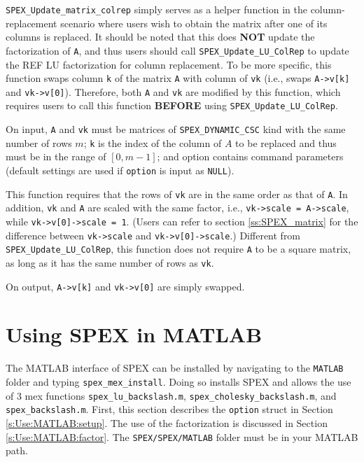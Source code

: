 \documentclass[12pt]{report}
\theoremstyle{definition}
\begin{document}
{\verb|SPEX_Update_matrix_colrep| simply serves as a helper function in the column-replacement scenario where users wish to obtain the matrix after one of its columns is replaced. It should be noted that this does {\bf NOT} update the factorization of \verb|A|, and thus users should call \verb|SPEX_Update_LU_ColRep| to update the REF LU factorization for column replacement. To be more specific, this function swaps column \verb|k| of the matrix \verb|A| with column of \verb|vk| (i.e., swaps \verb|A->v[k]| and \verb|vk->v[0]|). Therefore, both \verb|A| and \verb|vk| are modified by this function, which requires users to call this function {\bf BEFORE} using \verb|SPEX_Update_LU_ColRep|.

On input, \verb|A| and \verb|vk| must be matrices of \verb|SPEX_DYNAMIC_CSC| kind with the same number of rows $m$; \verb|k| is the index of the column of $A$ to be replaced and thus must be in the range of $[0,m-1]$; and option contains command parameters (default settings are used if \verb|option| is input as \verb|NULL|).

This function requires that the rows of \verb|vk| are in the same order as that of \verb|A|. In addition, \verb|vk| and \verb|A|  are scaled with the same factor, i.e., \verb|vk->scale = A->scale|, while \verb|vk->v[0]->scale = 1|. (Users can refer to section \ref{ss:SPEX_matrix} for the difference between \verb|vk->scale| and \verb|vk->v[0]->scale|.) Different from \verb|SPEX_Update_LU_ColRep|, this function does not require \verb|A| to be a square matrix, as long as it has the same number of rows as \verb|vk|.

On output, \verb|A->v[k]| and \verb|vk->v[0]| are simply swapped. 
}

\chapter{Using SPEX in MATLAB}
\label{s:Use:MATLAB}

The MATLAB interface of SPEX can be installed by navigating to the \verb|MATLAB| folder and typing \verb|spex_mex_install|. 
Doing so installs SPEX and allows the use of 3 mex functions \verb|spex_lu_backslash.m|, \verb|spex_cholesky_backslash.m|, and \verb|spex_backslash.m|. First, this section describes the
\verb|option| struct in Section \ref{s:Use:MATLAB:setup}.
The use of the factorization is discussed in Section \ref{s:Use:MATLAB:factor}.
The \verb|SPEX/SPEX/MATLAB| folder must be in your MATLAB path.
\end{document}
